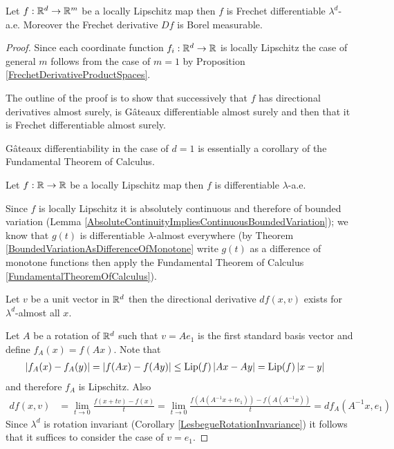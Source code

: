 \begin{thm}\label{RademachersTheorem}Let $f : \mathbb{R}^d \to \mathbb{R}^m$ be a locally Lipschitz map then $f$ is 
Frechet differentiable $\lambda^d$-a.e.  Moreover the Frechet derivative $Df$ is Borel measurable.
\end{thm}
\begin{proof}
Since each coordinate function $f_i : \mathbb{R}^d \to \mathbb{R}$ is locally Lipschitz the case of general $m$ follows from the case of $m=1$ by Proposition \ref{FrechetDerivativeProductSpaces}.

The outline of the proof is to show that successively that $f$ has directional derivatives almost surely, is G\^{a}teaux differentiable almost surely and then that it is Frechet differentiable almost surely.  

G\^{a}teaux differentiability in the case of $d=1$ is essentially a corollary of the Fundamental Theorem of Calculus.
\begin{clm}Let $f : \mathbb{R} \to \mathbb{R}$ be a locally Lipschitz map then $f$ is differentiable $\lambda$-a.e.
\end{clm}
Since $f$ is locally Lipschitz it is absolutely continuous and therefore of bounded variation (Lemma \ref{AbsoluteContinuityImpliesContinuousBoundedVariation}); we know that $g(t)$ is differentiable $\lambda$-almost everywhere (by Theorem  \ref{BoundedVariationAsDifferenceOfMonotone} write $g(t)$ as a difference of monotone functions then apply the Fundamental Theorem of Calculus \ref{FundamentalTheoremOfCalculus}).  


\begin{clm}Let $v$ be a unit vector in $\mathbb{R}^d$ then the directional derivative $df(x,v)$ exists for $\lambda^d$-almost all $x$.
\end{clm}
Let $A$ be a rotation of $\mathbb{R}^d$ such that $v = A e_1$ is the first standard basis vector and define $f_A(x) = f (A x)$.  Note that 
\begin{align*}
\left \vert f_A(x) - f_A(y) \right \vert &= \left \vert f(Ax) - f(Ay) \right \vert \leq \operatorname*{Lip}(f) \left \vert Ax - Ay \right \vert = \operatorname*{Lip}(f) \left \vert x - y \right \vert 
\end{align*}
and therefore $f_A$ is Lipschitz.  Also
\begin{align*}
df(x,v) &= \lim_{t \to 0} \frac{f(x+tv) - f(x)}{t} = \lim_{t \to 0} \frac{f(A (A^{-1} x+te_1)) - f(A (A^{-1} x))}{t} = df_A(A^{-1} x, e_1)
\end{align*}
Since $\lambda^d$ is rotation invariant (Corollary \ref{LesbegueRotationInvariance}) it follows that it suffices to consider the case of $v=e_1$. 


\end{proof}
